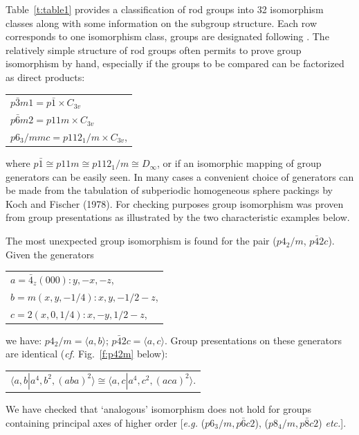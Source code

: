 \documentclass[11pt,a4paper]{article}
\begin{document}
Table~\ref{t:table1} provides a classification of rod groups into 32 isomorphism classes along with some information on the subgroup structure. Each row corresponds to one isomorphism class, groups are designated following \cite{ITE}.  The relatively simple structure of rod groups often permits to prove group isomorphism by hand, especially if the groups to be compared can be factorized as direct products:

\begin{center}
\begin{tabular}{l}
$p\bar3m1 = p\bar1 \times C_{3v}$ \\ 
$p\bar6m2 = p11m \times C_{3v}$ \\
$p6_3/mmc = p112_1/m \times C_{3v}$,
\end{tabular}
\end{center}

\noindent where $p\bar1 \cong p11m \cong p112_1/m \cong D_{\infty}$, or if an isomorphic mapping of group generators can be easily seen. In many cases a convenient choice of generators can be made from the tabulation of subperiodic homogeneous sphere packings by Koch and Fischer (1978). For checking purposes group isomorphism was proven from group presentations as illustrated by the two characteristic examples below.


The most unexpected group isomorphism is found for the pair ($p4_2/m$, $p\bar42c$). Given the generators %

\begin{center}
\begin{tabular}{l}
$a = \bar4_z(000) : y, -x, -z$,\\
$b = m(x, y, -1/4) : x, y, -1/2-z$,\\
$c = 2(x, 0, 1/4) : x, -y, 1/2-z$,
\end{tabular}
\end{center}

\noindent we have: $p4_2/m = \langle a, b \rangle$; $p\bar42c = \langle a, c \rangle$. Group presentations on these generators are identical (\emph{cf.} Fig.~\ref{f:p42m} below):

\begin{center}
\begin{tabular}{l}
$\langle a, b  | a^4, b^2, (aba)^2 \rangle \cong \langle a, c | a^4, c^2, (aca)^2 \rangle$.
\end{tabular}
\end{center}

\noindent We have checked that `analogous' isomorphism does not hold for groups containing principal axes of higher order [\emph{e.g.} ($p6_3/m, p\bar6c2$), ($p8_4/m, p\bar8c2$) \emph{etc.}].
\end{document}
